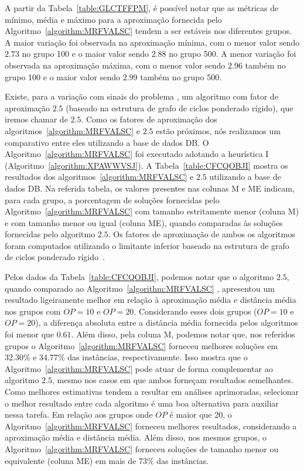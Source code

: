 

A partir da Tabela~\ref{table:GLCTFFPM}, é possível notar que as métricas de mínimo, média e máximo para a aproximação fornecida pelo Algoritmo~\ref{algorithm:MRFVALSC} tendem a ser estáveis nos diferentes grupos. A maior variação foi observada na aproximação mínima, com o menor valor sendo $2.73$ no grupo 100 e o maior valor sendo $2.88$ no grupo 500. A menor variação foi observada na aproximação máxima, com o menor valor sendo $2.96$ também no grupo 100 e o maior valor sendo $2.99$ também no grupo 500. 

Existe, para a variação com sinais do problema \SbIRTM{}, um algoritmo com fator de aproximação $2.5$ (baseado na estrutura de grafo de ciclos ponderado rígido), que iremos chamar de $2.5$\SbIRTM{}. Como os fatores de aproximação dos algoritmos~\ref{algorithm:MRFVALSC} e $2.5$\SbIRTM{} estão próximos, nós realizamos um comparativo entre eles utilizando a base de dados DB\textsubscript{\SbIRTM}. O Algoritmo~\ref{algorithm:MRFVALSC} foi executado adotando a heurística I (Algoritmo~\ref{algorithm:XPAWWVSJ}). A Tabela~\ref{table:CFCQOBJI} mostra os resultados dos algoritmos~\ref{algorithm:MRFVALSC} e $2.5$\SbIRTM{} utilizando a base de dados DB\textsubscript{\SbIRTM}. Na referida tabela, os valores presentes nas colunas M e ME indicam, para cada grupo, a porcentagem de soluções fornecidas pelo Algoritmo~\ref{algorithm:MRFVALSC} com tamanho estritamente menor (coluna M) e com tamanho menor ou igual (coluna ME), quando comparadas às soluções fornecidas pelo algoritmo $2.5$\SbIRTM{}. Os fatores de aproximação de ambos os algoritmos foram computados utilizando o limitante inferior baseado na estrutura de grafo de ciclos ponderado rígido~\cite[Teorema 7.6]{2021a-oliveira-etal}.



Pelos dados da Tabela~\ref{table:CFCQOBJI}, podemos notar que o algoritmo $2.5$\SbIRTM{}, quando comparado ao Algoritmo~\ref{algorithm:MRFVALSC} , apresentou um resultado ligeiramente melhor em relação à aproximação média e distância média nos grupos com $OP =10$ e $OP=20$. Considerando esses dois grupos ($OP=10$ e $OP=20$), a diferença absoluta entre a distância média fornecida pelos algoritmos foi menor que $0.61$. Além disso, pela coluna M, podemos notar que, nos referidos grupos o Algoritmo~\ref{algorithm:MRFVALSC} forneceu melhores soluções em 32.30\% e 34.77\% das instâncias, respectivamente. Isso mostra que o Algoritmo~\ref{algorithm:MRFVALSC} pode atuar de forma complementar ao algoritmo $2.5$\SbIRTM{}, mesmo nos casos em que ambos forneçam resultados semelhantes. Como melhores estimativas tendem a resultar em análises aprimoradas, selecionar o melhor resultado entre cada algoritmo é uma boa alternativa para auxiliar nessa tarefa. Em relação aos grupos onde $OP$ é maior que 20, o Algoritmo~\ref{algorithm:MRFVALSC} forneceu melhores resultados, considerando a aproximação média e distância média. Além disso, nos mesmos grupos, o Algoritmo~\ref{algorithm:MRFVALSC} forneceu soluções de tamanho menor ou equivalente (coluna ME) em mais de 73\% das instâncias.

